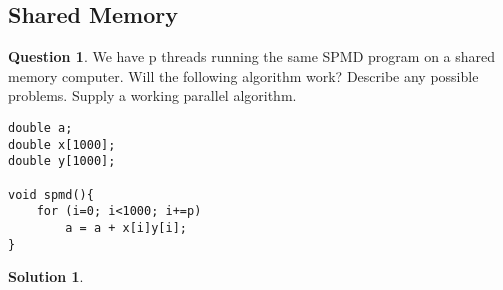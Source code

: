 \documentclass[a4paper, 10pt, oneside]{article}
\theoremstyle{definition}
\newtheorem*{question}{Question}
\newtheorem*{solution}{Solution}
\begin{document}
\subsection{Shared Memory}
\begin{question}
We have p threads running the same SPMD program on a shared memory computer. Will the following algorithm work? Describe any possible problems. Supply a working parallel algorithm.
\begin{lstlisting}[caption={SPMD program on a shared memory computer},label=lst:spmd]
double a;
double x[1000];
double y[1000];

void spmd(){
	for (i=0; i<1000; i+=p)
		a = a + x[i]y[i];
}
\end{lstlisting}

\end{question}
\begin{solution}
\end{solution}

\newpage
\appendix
\printbibliography
\end{document}
